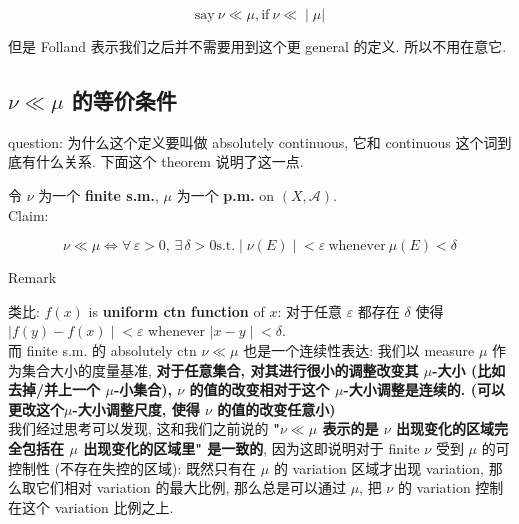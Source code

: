 \[\left. \text{say}\ \nu \ll \mu,\text{if}\ \nu \ll \middle| \mu| \right.\]

但是 Folland 表示我们之后并不需要用到这个更 general 的定义. 所以不用在意它.

\subsection{\texorpdfstring{\(\nu \ll \mu\) 的等价条件}{\textbackslash nu \textbackslash ll \textbackslash mu 的等价条件}}\label{nu-ll-mu-ux7684ux7b49ux4ef7ux6761ux4ef6}

question: 为什么这个定义要叫做 absolutely continuous, 它和 continuous 这个词到底有什么关系. 下面这个 theorem 说明了这一点.

\begin{theorem}{}

令 \(\nu\) 为一个 \textbf{finite s.m.}, \(\mu\) 为一个 \textbf{p.m.} on \((X,\mathcal{A})\).\\
Claim:

\[\left. \nu \ll \mu\Leftrightarrow\forall\,\varepsilon > 0,\,\exists\,\delta > 0\text{s.t.} \middle| \nu(E) \middle| < \varepsilon\ \text{whenever}\ \mu(E) < \delta \right.\]

\end{theorem}

\begin{qlremark}{Remark}

类比: \(f(x)\) is \textbf{uniform ctn function} of \(x\): 对于任意 \(\varepsilon\) 都存在 \(\delta\) 使得 \(\left. |f(y) - f(x) \middle| < \varepsilon \right.\) whenever \(\left. |x - y \middle| < \delta \right.\).\\
而 finite s.m. 的 absolutely ctn \(\nu \ll \mu\) 也是一个连续性表达: 我们以 measure \(\mu\) 作为集合大小的度量基准, \textbf{对于任意集合, 对其进行很小的调整改变其 \(\mu\)-大小 (比如去掉/并上一个 \(\mu\)-小集合), \(\nu\) 的值的改变相对于这个 \(\mu\)-大小调整是连续的. (可以更改这个\(\mu\)-大小调整尺度, 使得 \(\nu\) 的值的改变任意小)}\\
我们经过思考可以发现, 这和我们之前说的 \textbf{"\(\nu \ll \mu\) 表示的是 \(\nu\) 出现变化的区域完全包括在 \(\mu\) 出现变化的区域里" 是一致的}, 因为这即说明对于 finite \(\nu\) 受到 \(\mu\) 的可控制性 (不存在失控的区域): 既然只有在 \(\mu\) 的 variation 区域才出现 variation, 那么取它们相对 variation 的最大比例, 那么总是可以通过 \(\mu\), 把 \(\nu\) 的 variation 控制在这个 variation 比例之上.

\end{qlremark}

